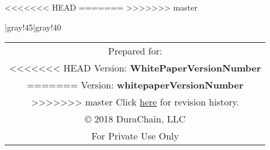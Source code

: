 <<<<<<< HEAD
\def\WhitePaperVersionNumber{unknown revision}
=======
\def\whitepaperVersionNumber{unknown revision}
>>>>>>> master
\vfill
\begin{center}
\tabulinesep=2mm
  \taburulecolor |{gray!45}|{gray!40} \arrayrulewidth=1pt
\begin{tabu}{||c||}
  \hline \hline
  Prepared for: \\
<<<<<<< HEAD
  \small{Version:} \textbf{WhitePaperVersionNumber} \\
=======
  \small{Version:} \textbf{whitepaperVersionNumber} \\
>>>>>>> master
	\small
  Click {\href{https://github.com/durachain/whitepaper/commits/master}{here} for revision history.} \\
  \copyright\hspace{.25em} 2018 DuraChain, LLC\\
  For Private Use Only \\ \hline \hline
\end{tabu}

\end{center}
\vfill
